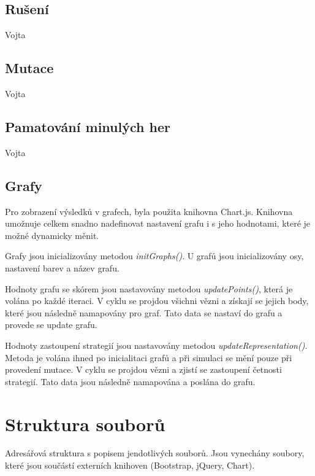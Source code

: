 \documentclass[12pt, a4paper]{article}
\begin{document}
\subsection{Rušení}
Vojta


\subsection{Mutace}
Vojta


\subsection{Pamatování minulých her}
Vojta

\subsection{Grafy}
\noindent Pro zobrazení výsledků v grafech, byla použita knihovna Chart.js. Knihovna umožnuje celkem snadno nadefinovat nastavení grafu i s jeho hodnotami, které je možné dynamicky měnit.

Grafy jsou inicializovány metodou \textit{initGraphs()}. U grafů jsou inicializovány osy, nastavení barev a název grafu.

Hodnoty grafu se skórem jsou nastavovány metodou \textit{updatePoints()}, která je volána po každé iteraci. V cyklu se projdou všichni vězni a získají se jejich body, které jsou následně namapovány pro graf. Tato data se nastaví do grafu a provede se update grafu.

Hodnoty zastoupení strategií jsou nastavovány metodou \textit{updateRepresentation()}. Metoda je volána ihned po inicialitaci grafů a při simulaci se mění pouze při provedení mutace. V cyklu se projdou vězni a zjistí se zastoupení četnosti strategií. Tato data jsou následně namapována a poslána do grafu.

\section{Struktura souborů}
\nointent Adresářová struktura s popisem jendotlivých souborů. Jsou vynechány soubory, které jsou součástí externích knihoven (Bootstrap, jQuery, Chart).
\end{document}
